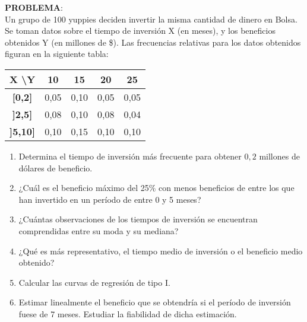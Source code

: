 \documentclass[12pt]{article}
\begin{document}
    \begin{ejercicio}
        \textbf{PROBLEMA}:\\
        Un grupo de 100 yuppies deciden invertir la misma cantidad de dinero en Bolsa. Se toman datos sobre el tiempo de inversión X (en meses), y los beneficios obtenidos Y (en millones de \$). Las frecuencias relativas para los datos obtenidos figuran en la siguiente tabla:

        \begin{center}
            \begin{tabular}{| c | c | c | c | c |}
                \hline
                \textbf{X \textbackslash Y} & \textbf{10} & \textbf{15} & \textbf{20} & \textbf{25} \\
                \hline
                \textbf{[0,2]} & 0,05 & 0,10 & 0,05 & 0,05 \\
                \hline
                \textbf{]2,5]} & 0,08 & 0,10 & 0,08 & 0,04 \\
                \hline
                \textbf{]5,10]} & 0,10 & 0,15 & 0,10 & 0,10 \\
                \hline
            \end{tabular}
        \end{center}

        \begin{enumerate}
            \item Determina el tiempo de inversión más frecuente para obtener $0,2$ millones de dólares de beneficio.
            \item ¿Cuál es el beneficio máximo del 25\% con menos beneficios de entre los que han invertido en un período de entre 0 y 5 meses?
            \item ¿Cuántas observaciones de los tiempos de inversión se encuentran comprendidas entre su moda y su mediana?
            \item ¿Qué es más representativo, el tiempo medio de inversión o el beneficio medio obtenido?
            \item Calcular las curvas de regresión de tipo I.
            \item Estimar linealmente el beneficio que se obtendría si el período de inversión fuese de 7 meses. Estudiar la fiabilidad de dicha estimación.
        \end{enumerate}

    \end{ejercicio}
    
    
\end{document}
